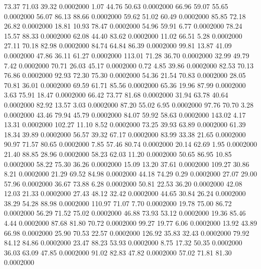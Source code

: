   73.37   71.03   39.32   0.0002000
   1.07   44.76   50.63   0.0002000
  66.96   59.07   55.65   0.0002000
  56.07   86.13   88.66   0.0002000
  59.62   51.02   60.49   0.0002000
  85.85   72.18   26.82   0.0002000
  18.81   10.93   78.47   0.0002000
  54.96   59.91    6.77   0.0002000
  78.24   15.57   88.33   0.0002000
  62.08   44.40   83.62   0.0002000
  11.02   66.51    5.28   0.0002000
  27.11   70.18   82.98   0.0002000
  84.74   64.84   86.39   0.0002000
  99.81   13.87   41.09   0.0002000
  47.86   36.11   61.27   0.0002000
 113.01   71.28   36.70   0.0002000
  32.99   49.79    7.42   0.0002000
  70.71   26.03   45.17   0.0002000
   0.72    4.85   39.86   0.0002000
  82.53   70.13   76.86   0.0002000
  92.93   72.30   75.30   0.0002000
  54.36   21.54   70.83   0.0002000
  28.05   70.81   36.01   0.0002000
  69.59   61.71   85.56   0.0002000
  65.36   19.96   87.99   0.0002000
   3.63   75.91   18.47   0.0002000
  66.42   73.77   81.68   0.0002000
  31.94   63.78   40.64   0.0002000
  82.92   13.57    3.03   0.0002000
  87.20   55.02    6.95   0.0002000
  97.76   70.70    3.28   0.0002000
  43.46   79.94   45.79   0.0002000
  84.07   59.92   58.63   0.0002000
 143.02    4.17   13.31   0.0002000
 102.27   11.10    8.52   0.0002000
  73.25   39.93   63.89   0.0002000
  61.39   18.34   39.89   0.0002000
  56.57   39.32   67.17   0.0002000
  83.99   33.38   21.65   0.0002000
  90.97   71.57   80.65   0.0002000
   7.85   57.46   80.74   0.0002000
  20.14   62.69    1.95   0.0002000
  21.40   88.85   28.96   0.0002000
  58.23   62.03   11.20   0.0002000
  50.65   86.95   10.85   0.0002000
  58.22   75.30   36.26   0.0002000
  15.09   13.20   37.61   0.0002000
 109.27   30.86    8.21   0.0002000
  21.29   69.52   84.98   0.0002000
  44.18   74.29    0.29   0.0002000
  27.07   29.00   57.96   0.0002000
  36.67   73.88    6.28   0.0002000
  50.81   22.53   36.20   0.0002000
  42.08   12.03   21.33   0.0002000
  27.43   48.12   32.42   0.0002000
  44.65   30.84   26.24   0.0002000
  38.29   54.28   88.98   0.0002000
 110.97   71.07    7.70   0.0002000
  19.78   75.00   86.72   0.0002000
  56.29   71.52   75.02   0.0002000
  46.88   73.93   53.12   0.0002000
  19.36   85.46    4.44   0.0002000
  87.68   81.80   70.72   0.0002000
  99.27   19.77    6.06   0.0002000
  13.92   43.89   66.98   0.0002000
  25.90   70.53   22.57   0.0002000
 126.92   35.83   32.43   0.0002000
  79.92   84.12   84.86   0.0002000
  23.47   88.23   53.93   0.0002000
   8.75   17.32   50.35   0.0002000
  36.03   63.09   47.85   0.0002000
  91.02   82.83   47.82   0.0002000
  57.02   71.81   81.30   0.0002000
